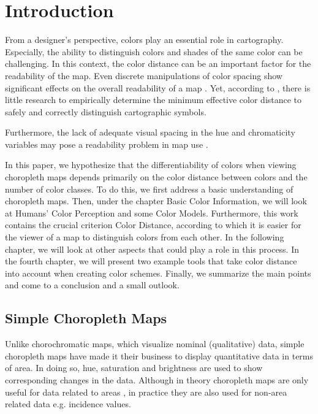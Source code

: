\section{Introduction}
From a designer's perspective, colors play an essential role in cartography. Especially, the ability to distinguish colors and shades of the same color can be challenging. In this context, the color distance can be an important factor for the readability of the map. Even discrete manipulations of color spacing show significant effects on the overall readability of a map \parencite{brychtovaC2015,brychtova2015, brychtovaV2014,brychtovaC2016}. Yet, according to \textcite{brychtovaC2017}, there is little research to empirically determine the minimum effective color distance to safely and correctly distinguish cartographic symbols. 

Furthermore, the lack of adequate visual spacing in the hue and chromaticity variables may pose a readability problem in map use \parencite{chesneau2007, steinrucken2013, stigmar2010}.

In this paper, we hypothesize that the differentiability of colors when viewing choropleth maps depends primarily on the color distance between colors and the number of color classes. To do this, we first address a basic understanding of choropleth maps. Then, under the chapter Basic Color Information, we will look at Humans' Color Perception and some Color Models. Furthermore, this work contains the crucial criterion Color Distance, according to which it is easier for the viewer of a map to distinguish colors from each other. In the following chapter, we will look at other aspects that could play a role in this process. In the fourth chapter, we will present two example tools that take color distance into account when creating color schemes. Finally, we summarize the main points and come to a conclusion and a small outlook. 

\subsection{Simple Choropleth Maps}
Unlike chorochromatic maps, which visualize nominal (qualitative) data, simple choropleth maps have made it their business to display quantitative data in terms of area. In doing so, hue, saturation and brightness are used to show corresponding changes in the data. Although in theory choropleth maps are only useful for data related to areas \parencite{hruby2016, schiewe2015}, in practice they are also used for non-area related data e.g. incidence values.

